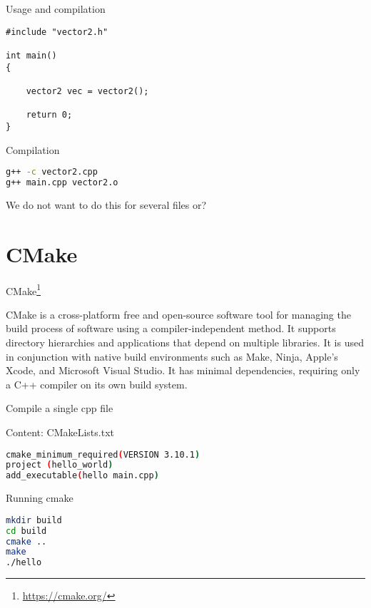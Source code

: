 \documentclass[\classoption]{beamer}
\begin{document}
\begin{frame}[fragile]{Usage and compilation}
\begin{lstlisting}
#include "vector2.h"

int main()
{
   
    vector2 vec = vector2();

    return 0;
}
\end{lstlisting}

\begin{block}{Compilation}
\begin{lstlisting}[language=bash]
g++ -c vector2.cpp
g++ main.cpp vector2.o
\end{lstlisting}
\end{block}
\begin{center}
We do not want to do this for several files or?
\end{center}
\end{frame}

\section{CMake}

\begin{frame}{CMake\footnote{\tiny\url{https://cmake.org/}}}

CMake is a cross-platform free and open-source software tool for managing the build process of software using a compiler-independent method. It supports directory hierarchies and applications that depend on multiple libraries. It is used in conjunction with native build environments such as Make, Ninja, Apple's Xcode, and Microsoft Visual Studio. It has minimal dependencies, requiring only a C++ compiler on its own build system. 

\end{frame}

\begin{frame}[fragile]{Compile a single cpp file}
\begin{block}{Content: CMakeLists.txt}
\begin{lstlisting}[language=bash]
cmake_minimum_required(VERSION 3.10.1)
project (hello_world)
add_executable(hello main.cpp)
\end{lstlisting}
\end{block}

\begin{block}{Running cmake}
\begin{lstlisting}[language=bash]
mkdir build 
cd build
cmake ..
make
./hello
\end{lstlisting}
\end{block}
\end{frame}
\end{document}
